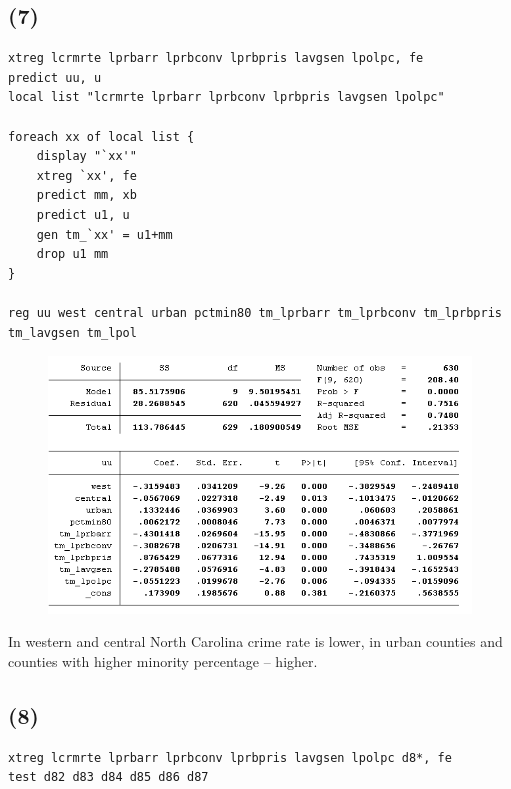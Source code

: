 \documentclass[12pt,a4paper, oneside]{extreport}
\begin{document}
\newpage

\subsection*{(7)}

\begin{verbatim}
xtreg lcrmrte lprbarr lprbconv lprbpris lavgsen lpolpc, fe
predict uu, u
local list "lcrmrte lprbarr lprbconv lprbpris lavgsen lpolpc"

foreach xx of local list {
	display "`xx'"
	xtreg `xx', fe
	predict mm, xb
	predict u1, u
	gen tm_`xx' = u1+mm
	drop u1 mm
}

reg uu west central urban pctmin80 tm_lprbarr tm_lprbconv tm_lprbpris 
tm_lavgsen tm_lpol
\end{verbatim}

\begin{figure}[H]
	\centering
	\includegraphics[width=0.7\linewidth]{screenshot028}
	\label{fig:screenshot001}
\end{figure}

In western and central North Carolina crime rate is lower, in urban counties and counties with higher minority percentage -- higher.

\newpage

\subsection*{(8)}

\begin{verbatim}
xtreg lcrmrte lprbarr lprbconv lprbpris lavgsen lpolpc d8*, fe
test d82 d83 d84 d85 d86 d87
\end{verbatim}

\end{document}
